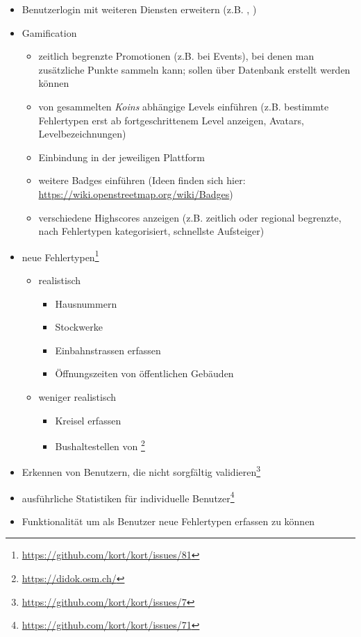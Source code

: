 \begin{itemize}
	\item Benutzerlogin mit weiteren  Diensten erweitern (z.B. , )
	\item \gls{Gamification}
	\begin{itemize}
		\item zeitlich begrenzte Promotionen (z.B. bei Events), bei denen man zusätzliche Punkte sammeln kann; sollen über Datenbank erstellt werden können
		\item von gesammelten \emph{Koins} abhängige Levels einführen (z.B. bestimmte Fehlertypen erst ab fortgeschrittenem Level anzeigen, Avatars, Levelbezeichnungen)
		\item Einbindung in  der jeweiligen Plattform
		\item weitere Badges einführen (Ideen finden sich hier: \url{https://wiki.openstreetmap.org/wiki/Badges})
		\item verschiedene Highscores anzeigen (z.B. zeitlich oder regional begrenzte, nach Fehlertypen kategorisiert, schnellste Aufsteiger)
	\end{itemize}
	\item neue Fehlertypen\footnote{\url{https://github.com/kort/kort/issues/81}}
	\begin{itemize}
		\item realistisch
		\begin{itemize}
			\item Hausnummern
			\item Stockwerke
			\item Einbahnstrassen erfassen
			\item Öffnungszeiten von öffentlichen Gebäuden
		\end{itemize}
		\item weniger realistisch
		\begin{itemize}
			\item Kreisel erfassen
			\item Bushaltestellen von \footnote{\url{https://didok.osm.ch/}}
		\end{itemize}
	\end{itemize}
	\item Erkennen von Benutzern, die nicht sorgfältig validieren\footnote{\url{https://github.com/kort/kort/issues/7}}
	\item ausführliche Statistiken für individuelle Benutzer\footnote{\url{https://github.com/kort/kort/issues/71}}
	\item Funktionalität um als Benutzer neue Fehlertypen erfassen zu können

\end{itemize}
